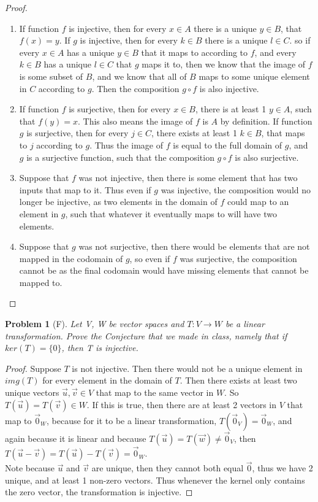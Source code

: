 \documentclass[12pt]{article}   %
\newtheorem{problem}{Problem}
\begin{document}
\begin{proof}\ \\ 
\begin{enumerate}[label=\roman*.]
    \item If function $f$ is injective, then for every $x\in A$ there is a unique $y\in B$, that $f(x)=y$. If $g$ is injective, then for every $k\in B$ there is a unique $l\in C$. so if every $x\in A$ has a unique $y\in B$ that it maps to according to $f$, and every $k \in B$ has a unique $l\in C$ that $g$ maps it to, then we know that the image of $f$ is some subset of $B$, and we know that all of $B$ maps to some unique element in $C$ according to $g$. Then the composition $g\circ f$ is also injective.
    \item If function $f$ is surjective, then for every $x\in B$, there is at least 1 $y\in A$, such that $f(y)=x$. This also means the image of $f$ is $A$ by definition. If function $g$ is surjective, then for every $j\in C$, there exists at least 1 $k \in B$, that maps to $j$ according to $g$. Thus the image of $f$ is equal to the full domain of $g$, and $g$ is a surjective function, such that the composition $g\circ f$ is also surjective.
    \item Suppose that $f$ was not injective, then there is some element that has two inputs that map to it. Thus even if $g$ was injective, the composition would no longer be injective, as two elements in the domain of $f$ could map to an element in $g$, such that whatever it eventually maps to will have two elements.
    \item Suppose that $g$ was not surjective, then there would be elements that are not mapped in the codomain of $g$, so even if $f$ was surjective, the composition cannot be as the final codomain would have missing elements that cannot be mapped to.
\end{enumerate}
\end{proof}
\begin{problem}[F]
Let V, W be vector spaces and $T : V \to W$ be a linear transformation. Prove the
Conjecture that we made in class, namely that if $ker(T) = \{0\}$, then T is injective.
\end{problem}
\begin{proof}
Suppose $T$ is not injective. Then there would not be a unique element in $img(T)$ for every element in the domain of $T$. Then there exists at least two unique vectors $\vec{u}, \vec{v} \in V$ that map to the same vector in $W$. So $T(\vec{u}) = T(\vec{v}) \in W$. If this is true, then there are at least 2 vectors in $V$ that map to $\vec{0}_W$, because for it to be a linear transformation, $T(\vec{0}_V)=\vec{0}_W$, and again because it is linear and because $T(\vec{u})=T(\vec{w})\neq \vec{0}_V$, then $T(\vec{u}-\vec{v})=T(\vec{u})-T(\vec{v})=\vec{0}_W$.\\
Note because $\vec{u}$ and $\vec{v}$ are unique, then they cannot both equal $\vec{0}$, thus we have 2 unique, and at least 1 non-zero vectors. Thus whenever the kernel only contains the zero vector, the transformation is injective.
\end{proof}
\end{document}
